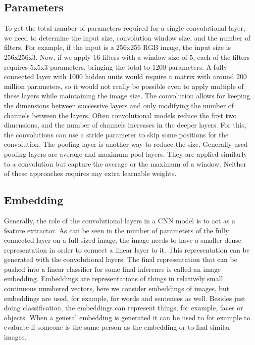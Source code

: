 \subsection{Parameters}
To get the total number of parameters required for a single convolutional layer, we need to determine the input size, convolution window size, and the number of filters.
For example, if the input is a 256x256 RGB image, the input size is 256x256x3.
Now, if we apply 16 filters with a window size of 5, each of the filters requires 5x5x3 parameters, bringing the total to 1200 parameters.
A fully connected layer with 1000 hidden units would require a matrix with around 200 million parameters, so it would not really be possible even to apply multiple of these layers while maintaining the image size.
The convolution allows for keeping the dimensions between successive layers and only modifying the number of channels between the layers.
Often convolutional models reduce the first two dimensions, and the number of channels increases in the deeper layers.
For this, the convolutions can use a stride parameter to skip some positions for the convolution.
The pooling layer is another way to reduce the size.
Generally used pooling layers are average and maximum pool layers. 
They are applied similarly to a convolution but capture the average or the maximum of a window.
Neither of these approaches requires any extra learnable weights.


\subsection{Embedding}
Generally, the role of the convolutional layers in a CNN model is to act as a feature extractor.
As can be seen in the number of parameters of the fully connected layer on a full-sized image, the image needs to have a smaller dense representation in order to connect a linear layer to it.
This representation can be generated with the convolutional layers.
The final representation that can be pushed into a linear classifier for some final inference is called an image embedding.
Embeddings are representations of things in relatively small continuous numbered vectors, here we consider embeddings of images, but embeddings are used, for example, for words and sentences as well.
Besides just doing classification, the embeddings can represent things, for example, faces or objects.
When a general embedding is generated it can be used to for example to evaluate if someone is the same person as the embedding or to find similar images.

